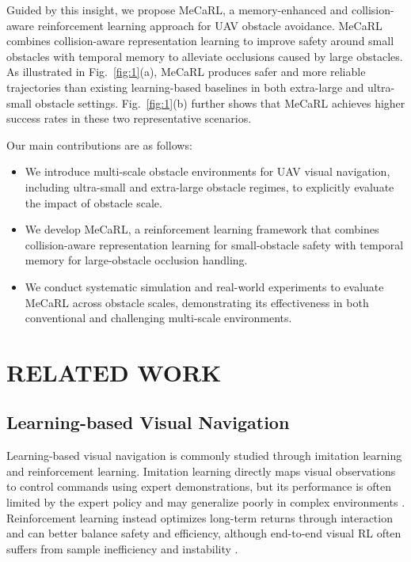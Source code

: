 \documentclass[letterpaper, 10 pt, conference]{ieeeconf}  %
\begin{document}
Guided by this insight, we propose MeCaRL, a memory-enhanced and collision-aware reinforcement learning approach for UAV obstacle avoidance. 
MeCaRL combines collision-aware representation learning to improve safety around small obstacles with temporal memory to alleviate occlusions caused by large obstacles. 
As illustrated in Fig.~\ref{fig:1}(a), MeCaRL produces safer and more reliable trajectories than existing learning-based baselines in both extra-large and ultra-small obstacle settings. 
Fig.~\ref{fig:1}(b) further shows that MeCaRL achieves higher success rates in these two representative scenarios. 

Our main contributions are as follows:
\begin{itemize}
  \item We introduce multi-scale obstacle environments for UAV visual navigation, including ultra-small and extra-large obstacle regimes, to explicitly evaluate the impact of obstacle scale.
  \item We develop MeCaRL, a reinforcement learning framework that combines collision-aware representation learning for small-obstacle safety with temporal memory for large-obstacle occlusion handling.
  \item We conduct systematic simulation and real-world experiments to evaluate MeCaRL across obstacle scales, demonstrating its effectiveness in both conventional and challenging multi-scale environments.
\end{itemize}


\section{RELATED WORK}

\subsection{Learning-based Visual Navigation}
Learning-based visual navigation is commonly studied through imitation learning and reinforcement learning. 
Imitation learning directly maps visual observations to control commands using expert demonstrations, but its performance is often limited by the expert policy and may generalize poorly in complex environments \cite{loquercio2021learning,bhattacharya2025vision}. 
Reinforcement learning instead optimizes long-term returns through interaction and can better balance safety and efficiency, although end-to-end visual RL often suffers from sample inefficiency and instability \cite{kaufmann2023champion}.
\end{document}
